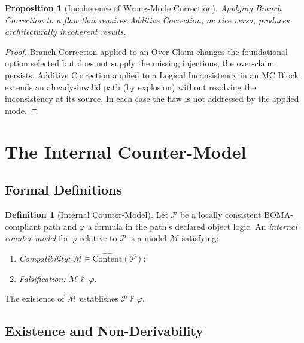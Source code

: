 \documentclass[12pt, a4paper]{article}
\theoremstyle{plain}
\newtheorem{proposition}[theorem]{Proposition}
\theoremstyle{definition}
\newtheorem{definition}[theorem]{Definition}
\theoremstyle{remark}
\newcommand{\BOMA}{\textsf{BOMA}}
\newcommand{\CC}[1]{\widehat{\mathrm{Content}}(#1)}
\newcommand{\MC}{\mathrm{MC}}
\begin{document}
\begin{proposition}[Incoherence of Wrong-Mode Correction]
\label{prop:wrong-mode}
Applying Branch Correction to a flaw that requires Additive
Correction, or vice versa, produces architecturally incoherent
results.
\end{proposition}

\begin{proof}
Branch Correction applied to an Over-Claim changes the foundational
option selected but does not supply the missing injections; the
over-claim persists. Additive Correction applied to a Logical
Inconsistency in an $\MC$ Block extends an already-invalid path
(by explosion) without resolving the inconsistency at its source.
In each case the flaw is not addressed by the applied mode.
\end{proof}

\section{The Internal Counter-Model}
\label{sec:counter}

\subsection{Formal Definitions}
\label{subsec:cm-defs}

\begin{definition}[Internal Counter-Model]
\label{def:cm}
Let $\mathcal{P}$ be a locally consistent \BOMA{}-compliant path and
$\varphi$ a formula in the path's declared object logic. An
\emph{internal counter-model} for $\varphi$ relative to $\mathcal{P}$
is a model $\mathcal{M}$ satisfying:
\begin{enumerate}
  \item \emph{Compatibility:} $\mathcal{M} \models
        \CC{\mathcal{P}}$;
  \item \emph{Falsification:} $\mathcal{M} \not\models \varphi$.
\end{enumerate}
The existence of $\mathcal{M}$ establishes $\mathcal{P} \nvdash
\varphi$.
\end{definition}

\subsection{Existence and Non-Derivability}
\label{subsec:cm-existence}
\end{document}
